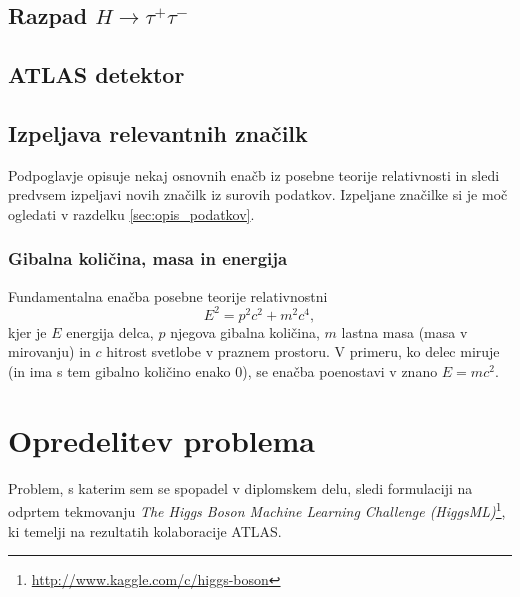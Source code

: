 \documentclass[11pt,a4paper,openany]{book}
\begin{document}


\section{Razpad $H \rightarrow \tau^+\tau^-$}

\cite{Baldi2014} \cite{atlas2013}


\section{ATLAS detektor}
\cite{AadScience2012}


\section{Izpeljava relevantnih značilk}
Podpoglavje opisuje nekaj osnovnih enačb iz posebne teorije relativnosti in sledi predvsem izpeljavi novih značilk iz surovih podatkov. Izpeljane značilke si je moč ogledati v razdelku \ref{sec:opis_podatkov}.

\subsection{Gibalna količina, masa in energija}
Fundamentalna enačba posebne teorije relativnostni
\begin{equation}
	E^2 = p^2c^2 + m^2c^4,
	\label{stirimoment}
\end{equation}
kjer je $E$ energija delca, $p$ njegova gibalna količina, $m$ lastna masa (masa v mirovanju) in $c$ hitrost svetlobe v praznem prostoru. V primeru, ko delec miruje (in ima s tem gibalno količino enako $0$), se enačba poenostavi v znano $E = mc^2$.


\chapter{Opredelitev problema}

Problem, s katerim sem se spopadel v diplomskem delu, sledi formulaciji na odprtem tekmovanju \textit{The Higgs Boson Machine Learning Challenge (HiggsML)}\footnote{ \url{http://www.kaggle.com/c/higgs-boson}}, ki temelji na rezultatih kolaboracije ATLAS\cite{Adam-Bourdarios14}. 
\end{document}
